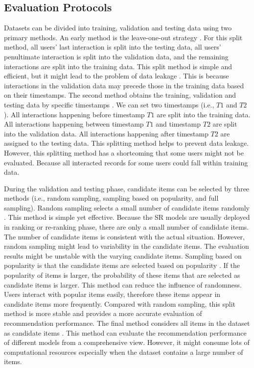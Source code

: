 \documentclass[review]{fcs}
\begin{document}
	\subsection{Evaluation Protocols}
	Datasets can be divided into training, validation and testing data using two primary methods. An early method is the leave-one-out strategy \cite{SASRec}. For this split method, all users' last interaction is split into the testing data, all users' penultimate interaction is split into the validation data, and the remaining interactions are split into the training data. This split method is simple and efficient, but it might lead to the problem of data leakage \cite{split_by_timestamp}. This is because interactions in the validation data may precede those in the training data based on their timestamps. The second method obtains the training, validation and testing data by specific timestamps \cite{CCA}. We can set two timestamps (i.e., $T1$ and $T2$). All interactions happening before timestamp $T1$ are split into the training data. All interactions happening between timestamp $T1$ and timestamp $T2$ are split into the validation data. All interactions happening after timestamp $T2$ are assigned to the testing data. This splitting method helps to prevent data leakage. However, this splitting method has a shortcoming that some users might not be evaluated. Because all interacted records for some users could fall within training data.
	
	During the validation and testing phase, candidate items can be selected by three methods (i.e., random sampling, sampling based on popularity, and full sampling). Random sampling selects a small number of candidate items randomly \cite{SASRec}. This method is simple yet effective. Because the SR models are usually deployed in ranking or re-ranking phase, there are only a small number of candidate items. The number of candidate items is consistent with the actual situation. However, random sampling might lead to variability in the candidate items. The evaluation results might be unstable with the varying candidate items. Sampling based on popularity is that the candidate items are selected based on popularity \cite{MGCL}. If the popularity of items is larger, the probability of these items that are selected as candidate items is larger. This method can reduce the influence of randomness. Users interact with popular items easily, therefore these items appear in candidate items more frequently. Compared with random sampling, this split method is more stable and provides a more accurate evaluation of recommendation performance. The final method considers all items in the dataset as candidate items \cite{DR4SR+}. This method can evaluate the recommendation performance of different models from a comprehensive view. However, it might consume lots of computational resources especially when the dataset contains a large number of items.
\end{document}
